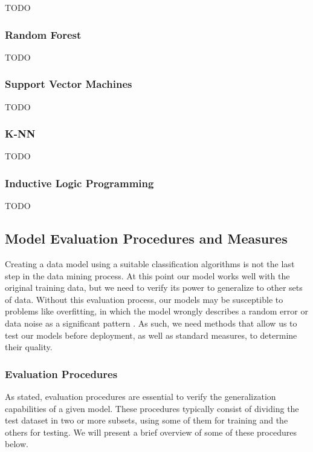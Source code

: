 TODO\\

\subsubsection*{Random Forest}

TODO\\

\subsubsection*{Support Vector Machines}

TODO\\

\subsubsection*{K-NN}

TODO\\

\subsubsection*{Inductive Logic Programming}

TODO\\

\subsection{Model Evaluation Procedures and Measures}

Creating a data model using a suitable classification algorithms is not the last
step in the data mining process. At this point our model works well with the
original training data, but we need to verify its power to generalize to other
sets of data. Without this evaluation process, our models may be susceptible to
problems like overfitting, in which the model wrongly describes a random error
or data noise as a significant pattern \cite{han2006data}. As such, we need
methods that allow us to test our models before deployment, as well as standard
measures, to determine their quality.

\subsubsection*{Evaluation Procedures}

As stated, evaluation procedures are essential to verify the generalization
capabilities of a given model. These procedures typically consist of dividing
the test dataset in two or more subsets, using some of them for training and the
others for testing. We will present a brief overview of some of these procedures
below.


